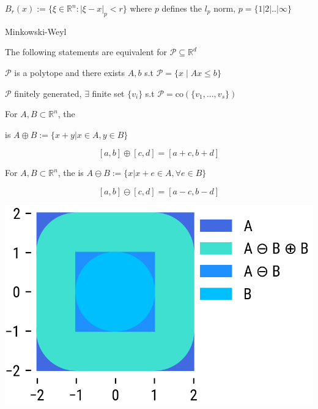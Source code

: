 \begin{definition}
	$B_r(x):=
		\{\xi\in\mathbb{R}^{n}:|\xi-x|_p<r\}$
	where $p$ defines the $l_p$ norm, $p=\{1|2|..|\infty\}$
\end{definition}


\begin{theorem}{Minkowski-Weyl}

	The following statements are equivalent
	for $\mathcal{P}\subseteq \mathbb{R}^d$

	$\mathcal{P}$ is a polytope and there exists
	$A, b$ s.t $\mathcal{P} = \{x \mid Ax \leq b\}$

	$\mathcal{P}$ finitely generated,
	$\exists$ finite set $\{v_i\}$ s.t
	$\mathcal{P}=\text{co}(\{v_1,...,v_s\})$
\end{theorem}

\begin{definition}
	For $A, B \subset \mathbb{R}^{n}$, the

	 is
	$A \oplus B := \{x + y | x \in A, y \in B\}$
\end{definition}
\[
	[a,b]\oplus[c,d] = [a+c,b+d]
\]
\begin{definition}
	For $A, B \subset \mathbb{R}^{n}$, the
	is
	$A \ominus B := \{x | x+e \in A, \forall e \in B\}$
\end{definition}
\[
	[a,b]\ominus[c,d] = [a-c,b-d]
\]

% 
\includegraphics{images/Pontryagin.png}

